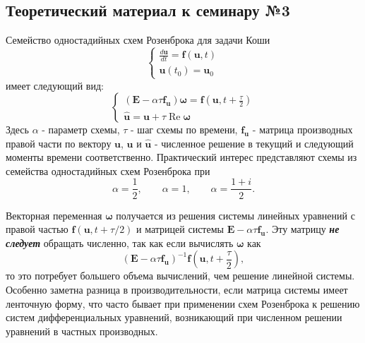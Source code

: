 \chapter{}

\section{Теоретический материал к семинару №3}

Семейство одностадийных схем Розенброка для задачи Коши
\begin{equation} \label{c3eq1}
	\begin{cases}
		\displaystyle \frac{d\mathbf{u}}{dt} = \mathbf{f} \left( \mathbf{u}, t \right) \\
		\mathbf{u}(t_0) = \mathbf{u}_0
	\end{cases}
\end{equation}
имеет следующий вид:
\begin{equation} \label{c3eq2}
	\begin{cases}
		\displaystyle \left( \mathbf{E} - \alpha \tau \mathbf{f_u} \right) \boldsymbol{\omega}= \mathbf{f} \left( \mathbf{u}, t + \frac{\tau}{2} \right) \\
		\mathbf{\hat{u}} = \mathbf{u} + \tau \operatorname{Re} \boldsymbol{\omega}
	\end{cases}
\end{equation}
Здесь $\alpha$ - параметр схемы, $\tau$ - шаг схемы по времени, $\mathbf{f_u}$ - матрица производных правой части по вектору $\mathbf{u}$, $\mathbf{u}$ и $\mathbf{\hat{u}}$ - численное решение в текущий и следующий моменты времени соответственно. Практический интерес представляют схемы из семейства одностадийных схем Розенброка при  
\begin{equation} \nonumber
\alpha = \frac{1}{2},
\qquad
\alpha = 1,
\qquad
\alpha = \frac{1+i}{2}.
\end{equation}

Векторная переменная $\boldsymbol{\omega}$ получается из решения системы линейных уравнений с правой частью $\mathbf{f} \left( \mathbf{u}, t + \tau/2 \right)$ и матрицей системы $\mathbf{E} - \alpha \tau \mathbf{f_u}$. Эту матрицу \textbf{\textit{не следует}} обращать численно, так как если вычислять  $\boldsymbol{\omega}$ как 
\begin{equation} \nonumber
	\left( \mathbf{E} - \alpha \tau \mathbf{f_u} \right)^{-1} \mathbf{f} \left( \mathbf{u}, t + \frac{\tau}{2} \right),
\end{equation}
то это потребует большего объема вычислений, чем решение линейной системы. Особенно заметна разница в производительности, если матрица системы имеет ленточную форму, что часто бывает при применении схем Розенброка к решению систем дифференциальных уравнений, возникающий при численном решении уравнений в частных производных.

